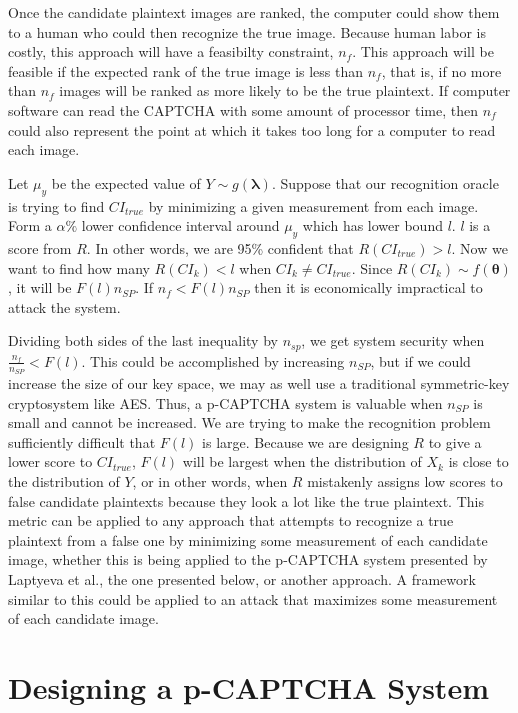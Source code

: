 \documentclass[12pt]{article}
\begin{document}
Once the candidate plaintext images are ranked, the computer could show them to a human who could then recognize the true image. Because human labor is costly, this approach will have a feasibilty constraint, $n_f$. This approach will be feasible if the expected rank of the true image is less than $n_f$, that is, if no more than $n_f$ images will be ranked as more likely to be the true plaintext. If computer software can read the CAPTCHA with some amount of processor time, then $n_f$ could also represent the point at which it takes too long for a computer to read each image.

Let $\mu_y$ be the expected value of $Y \sim g(\mathbf{\lambda})$. Suppose that our recognition oracle is trying to find $CI_{true}$ by minimizing a given measurement from each image. Form a $\alpha\%$ lower confidence interval around $\mu_y$ which has lower bound $l$. $l$ is a score from $R$. In other words, we are 95\% confident that $R(CI_{true}) > l$. Now we want to find how many $R(CI_k) < l$ when $CI_k \neq CI_{true}$. Since $R\left(CI_k\right) \sim f(\mathbf{\theta})$, it will be $F(l) n_{SP}$. If $n_f < F(l) n_{SP}$ then it is economically impractical to attack the system.

Dividing both sides of the last inequality by $n_{sp}$, we get system security when $\frac{n_f}{n_{SP}} < F(l)$. This could be accomplished by increasing $n_{SP}$, but if we could increase the size of our key space, we may as well use a traditional symmetric-key cryptosystem like AES. Thus, a p-CAPTCHA system is valuable when $n_{SP}$ is small and cannot be increased. We are trying to make the recognition problem sufficiently difficult that $F(l)$ is large. Because we are designing $R$ to give a lower score to $CI_{true}$, $F(l)$ will be largest when the distribution of $X_k$ is close to the distribution of $Y$, or in other words, when $R$ mistakenly assigns low scores to false candidate plaintexts because they look a lot like the true plaintext. This metric can be applied to any approach that attempts to recognize a true plaintext from a false one by minimizing some measurement of each candidate image, whether this is being applied to the p-CAPTCHA system presented by Laptyeva et al., the one presented below, or another approach. A framework similar to this could be applied to an attack that maximizes some measurement of each candidate image.

\section*{Designing a p-CAPTCHA System}
\end{document}
